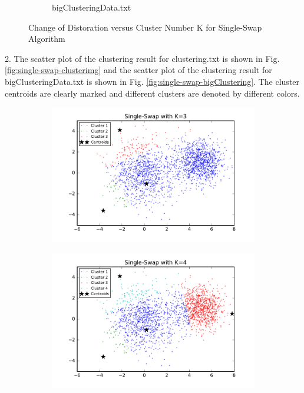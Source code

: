 \begin{description}
\begin{description}
\begin{figure}[H]
\begin{subfigure}[b]{0.49\textwidth}
            \caption{bigClusteringData.txt}\label{fig:7b}
        \end{subfigure}
\caption{Change of Distoration versus Cluster Number K for Single-Swap Algorithm}
\label{fig:single-swap-loss} 
\end{figure}

\item{2.} The scatter plot of the clustering result for clustering.txt is shown in Fig. \ref{fig:single-swap-clusterimg} and the scatter plot of the clustering result for bigClusteringData.txt is shown in Fig. \ref{fig:single-swap-bigClustering}. The cluster centroids are clearly marked and different clusters are denoted by different colors. 

\begin{figure}[!h]
        \centering
        \begin{subfigure}[b]{0.475\textwidth}
            \centering
            \includegraphics[width=\textwidth]{./figures/clustering_singleSwap_3.pdf}
        \end{subfigure}
        \hfill
        \begin{subfigure}[b]{0.475\textwidth}  
            \centering 
            \includegraphics[width=\textwidth]{./figures/clustering_singleSwap_4.pdf}

\end{subfigure}
\end{figure}
\end{description}
\end{description}
